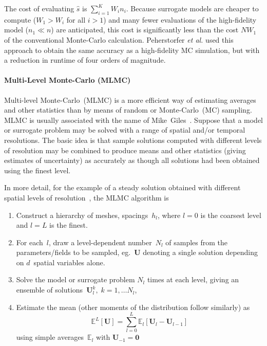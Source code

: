 The cost of evaluating $\hat{s}$ is $\sum_{i=1}^{K} W_in_i$.
Because surrogate models are cheaper to compute ($W_1>W_i$ for all $i>1$)
and many fewer evaluations of the high-fidelity model ($n_1\ll n$) are anticipated,
this cost is significantly less than the cost $NW_1$ of the conventional Monte-Carlo calculation.
Peherstorfer \emph{et al.} \cite{Pe16Opti} used this approach to obtain the same accuracy as a high-fidelity MC simulation, but with a reduction in runtime of four orders of magnitude.


\paragraph{Multi-Level Monte-Carlo (MLMC)}\label{sec:mlmc}
Multi-level Monte-Carlo~(MLMC) is a more efficient way of estimating averages
and other statistics than by means of random or Monte-Carlo~(MC) sampling. 
MLMC is usually associated with the name of Mike~Giles~\cite{Gi16Mult}.
Suppose that a model or surrogate problem may be solved with a range of
spatial and/or temporal resolutions. The basic idea is that sample solutions
computed with different levels of resolution may be combined to produce means
and other statistics 
(giving estimates of uncertainty) as accurately as though all solutions had been
obtained using the finest level.

In more detail, for the example of a steady solution obtained with
different spatial levels of resolution~\cite{Mi13Mult}, the MLMC algorithm is
\begin{enumerate}
\item Construct a hierarchy of meshes, spacings~$h_l$, where $l=0$ is the coarsest level
and $l=L$ is the finest.
\item For each~$l$, draw a level-dependent number~$N_l$ of samples from the parameters/fields
to be sampled, eg.\ 
${\mathbf U}$ denoting a single solution depending on $d$~spatial variables alone.
\item Solve the model or surrogate problem $N_l$ times at each level, giving an
ensemble of solutions~${\mathbf U}^k_l,\;k=1,\ldots N_l$,
\item Estimate the mean (other moments of the distribution follow similarly) as
\begin{equation}\label{eq:telescope}
{\mathbb E}^L[{\mathbf U}]= \sum_{l=0}^L {\mathbb E}_l[{\mathbf U}_l-{\mathbf U}_{l-1}]
\end{equation}
using simple averages~${\mathbb E}_l$ with ${\mathbf U}_{-1}={\mathbf 0}$
\end{enumerate}


